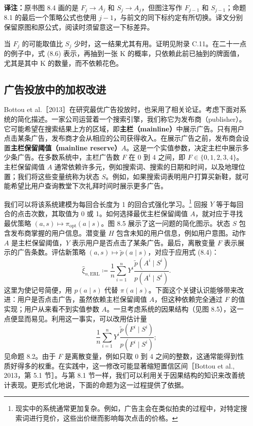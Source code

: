 \par\smallskip
{\small\noindent\textbf{译注：}原书图 8.4 画的是 $F_j\to A_j$ 和 $S_j\to A_j$，但图注写作 $F_{j-1}$ 和 $S_{j-1}$；命题 8.1 的最后一个策略公式也使用 $j-1$，与前文的同下标约定有所切换。译文分别保留原图和原公式，阅读时须留意这一下标差异。}
\par\smallskip

当 $F_j$ 的可能取值比 $S_j$ 少时，这一结果尤其有用。证明见附录 C.11。在二十一点的例子中，式 (8.6) 表示，再抽到一张 K 的概率，只依赖此前已抽到的牌面值，尤其是其中 K 的数量，而不依赖花色。

\subsection{广告投放中的加权改进}
\label{sec:ch08-advertisement}

Bottou et al.［2013］在研究最优广告投放时，也采用了相关论证。考虑下面对系统的简化描述。一家公司运营着一个搜索引擎，我们称它为发布商（publisher）。它可能希望在搜索结果上方的区域，即\textbf{主栏（mainline）}中展示广告。只有用户点击某条广告，发布商才会从相应的公司获得收入。在展示广告之前，发布商会设置\textbf{主栏保留阈值（mainline reserve）}$A$。这是一个实值参数，决定主栏中展示多少条广告。在多数系统中，主栏广告数 $F$ 在 0 到 4 之间，即 $F\in\{0,1,2,3,4\}$。主栏保留阈值 $A$ 通常依赖许多元，例如搜索词、搜索的日期和时间，以及地理位置；我们将这些变量统称为状态 $S$。例如，如果搜索词表明用户打算买新鞋，就可能希望比用户查询教堂下次礼拜时间时展示更多广告。

我们可以将该系统建模为每回合长度为 1 的回合式强化学习。\footnote{现实中的系统通常更加复杂。例如，广告主会在类似拍卖的过程中，对特定搜索词进行竞价，这些出价继而影响每次点击的价格。}
回报 $Y$ 等于每回合的点击次数，其取值为 0 或 1。如何选择最优主栏保留阈值 $A$，就对应于寻找最优策略 $(a,s)\mapsto\pi_{\mathrm{opt}}(a\mid s)$。图 8.5 展示了这一问题的简化图示。状态 $S$ 包含发布商掌握的用户信息。潜变量 $H$ 包含未知的用户信息，例如用户意图。动作 $A$ 是主栏保留阈值，$Y$ 表示用户是否点击了某条广告。最后，离散变量 $F$ 表示展示的广告条数。评估新策略 $(a,s)\mapsto\widetilde p(a\mid s)$，对应于应用式 (8.4)：
\[
 \widehat\xi_{n,\mathrm{ERL}}\coloneqq\frac1n\sum_{i=1}^n
 Y^i\frac{\widetilde p(A^i\mid S^i)}{p(A^i\mid S^i)}.
\]
这里为使记号简便，用 $p(a\mid s)$ 代替 $\pi(a\mid s)$。下面这个关键认识能够带来改进：用户是否点击广告，虽然依赖主栏保留阈值 $A$，但这种依赖完全通过 $F$ 的值实现；用户从来看不到实值参数 $A$。一旦考虑系统的因果结构（见图 8.5），这一点便显而易见。利用这一事实，可以改用估计量
\[
 \frac1n\sum_{i=1}^nY^i
 \frac{\widetilde p(F^i\mid S^i)}{p(F^i\mid S^i)};
\]
见命题 8.2。由于 $F$ 是离散变量，例如只取 0 到 4 之间的整数，这通常能得到性质好得多的权重。在实践中，这一修改可能显著缩短置信区间［Bottou et al., 2013，第 5.1 节］。与第 8.1 节一样，我们可以利用关于因果结构的知识来改善统计表现。更形式化地说，下面的命题为这一过程提供了依据。

